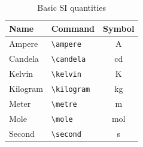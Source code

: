 \begin{table}
	\centering
	\captionsetup{justification=centering} %
	\caption{Basic SI quantities}%
	\begin{tabular}{llc}
		\toprule
		Name 	& 	Command 	& 	Symbol        \\
		\midrule
		Ampere 	 & \verb|\ampere| 	&\si{\ampere}\\
		Candela  & \verb|\candela| 	& \si{\candela} \\
		Kelvin 	 & \verb|\kelvin| 	&\si{\kelvin}\\
		Kilogram & \verb|\kilogram| & \si{\kilogram} \\
		Meter 	 & \verb|\metre| 	&\si{\metre}\\
		Mole 	 & \verb|\mole| 	&\si{\mole}\\
		Second 	 & \verb|\second| 	&\si{\second}\\
		\bottomrule
	\end{tabular}
\end{table}


